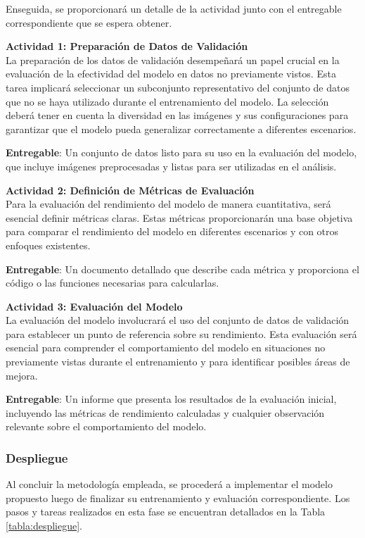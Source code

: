  Enseguida, se proporcionará un detalle de la actividad junto con el entregable correspondiente que se espera obtener.


 \textbf{Actividad 1: Preparación de Datos de Validación}
 \\
 La preparación de los datos de validación desempeñará un papel crucial en la evaluación de la efectividad del modelo en datos no previamente vistos. Esta tarea implicará seleccionar un subconjunto representativo del conjunto de datos que no se haya utilizado durante el entrenamiento del modelo. La selección deberá tener en cuenta la diversidad en las imágenes y sus configuraciones para garantizar que el modelo pueda generalizar correctamente a diferentes escenarios.
 
 \textbf{Entregable}: Un conjunto de datos listo para su uso en la evaluación del modelo, que incluye imágenes preprocesadas y listas para ser utilizadas en el análisis.
 
 \textbf{Actividad 2: Definición de Métricas de Evaluación}
 \\
 Para la evaluación del rendimiento del modelo de manera cuantitativa, será esencial definir métricas claras. Estas métricas proporcionarán una base objetiva para comparar el rendimiento del modelo en diferentes escenarios y con otros enfoques existentes.
 
 \textbf{Entregable}: Un documento detallado que describe cada métrica y proporciona el código o las funciones necesarias para calcularlas.
 
 \textbf{Actividad 3: Evaluación del Modelo}
 \\
 La evaluación del modelo involucrará el uso del conjunto de datos de validación para establecer un punto de referencia sobre su rendimiento. Esta evaluación será esencial para comprender el comportamiento del modelo en situaciones no previamente vistas durante el entrenamiento y para identificar posibles áreas de mejora.
 
 \textbf{Entregable}: Un informe que presenta los resultados de la evaluación inicial, incluyendo las métricas de rendimiento calculadas y cualquier observación relevante sobre el comportamiento del modelo.
 
\subsubsection{Despliegue}
Al concluir la metodología empleada, se procederá a implementar el modelo propuesto luego de finalizar su entrenamiento y evaluación correspondiente. Los pasos y tareas realizados en esta fase se encuentran detallados en la Tabla \ref{tabla:despliegue}.

